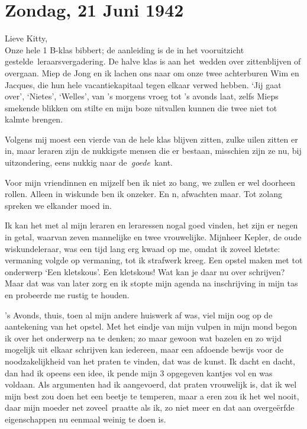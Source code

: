 \documentclass{book}
\begin{document}
\chapter{Zondag, 21 Juni 1942}

Lieve Kitty,\\Onze hele 1 B-klas bibbert; de aanleiding is de in het
vooruitzicht gestelde~leraarsvergadering. De halve klas is aan
het~wedden over zittenblijven of overgaan. Miep de Jong en ik lachen ons
naar om onze twee achterburen Wim en Jacques, die hun hele
vacantiekapitaal tegen elkaar verwed hebben. `Jij gaat over', `Nietes',
`Welles', van 's morgens vroeg tot 's avonds laat, zelfs Mieps smekende
blikken om stilte en mijn boze uitvallen kunnen die twee niet tot kalmte
brengen.

Volgens mij moest een vierde van de hele klas blijven zitten, zulke
uilen zitten er in, maar leraren zijn de nukkigste mensen die er
bestaan, misschien zijn ze nu, bij uitzondering, eens nukkig naar
de~\emph{goede}~kant.

Voor mijn vriendinnen en mijzelf ben ik niet zo bang, we zullen er wel
doorheen rollen. Alleen in wiskunde ben ik onzeker. En n, afwachten
maar. Tot zolang spreken we elkander moed in.

Ik kan het met al mijn leraren en leraressen nogal goed vinden, het zijn
er negen in getal, waarvan zeven mannelijke en twee vrouwelijke.
Mijnheer Kepler, de oude wiskundeleraar, was een tijd lang erg kwaad op
me, omdat ik zoveel kletste: vermaning volgde op vermaning, tot ik
strafwerk kreeg. Een opstel maken met tot onderwerp `Een kletskous'. Een
kletskous! Wat kan je daar nu over schrijven? Maar dat was van later
zorg en ik stopte mijn agenda na inschrijving in mijn tas en probeerde
me rustig te houden.

's Avonds, thuis, toen al mijn andere huiswerk af was, viel mijn oog op
de aantekening van het opstel. Met het eindje van mijn vulpen in mijn
mond begon ik over het onderwerp na te denken; zo maar gewoon wat
bazelen en zo wijd mogelijk uit elkaar schrijven kan iedereen, maar een
afdoende bewijs voor de noodzakelijkheid van het praten te vinden, dat
was de kunst. Ik dacht en dacht, dan had ik opeens een idee, ik pende
mijn 3 opgegeven kantjes vol en was voldaan. Als argumenten had ik
aangevoerd, dat praten vrouwelijk is, dat ik wel mijn best zou doen het
een beetje te temperen, maar a eren zou ik het wel nooit, daar mijn
moeder net zoveel~praatte als ik, zo niet meer en dat aan overgeërfde
eigenschappen nu eenmaal weinig te doen is.
\end{document}
